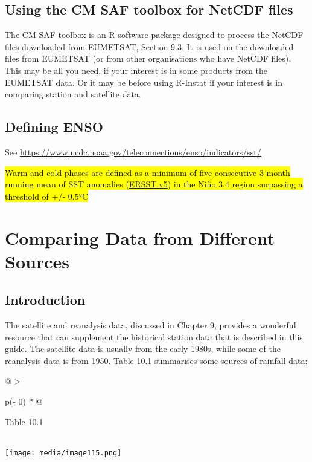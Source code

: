 \documentclass[
  letterpaper,
  DIV=11,
  numbers=noendperiod]{scrreprt}
\begin{document}
\section{Using the CM SAF toolbox for NetCDF
files}\label{using-the-cm-saf-toolbox-for-netcdf-files}

The CM SAF toolbox is an R software package designed to process the
NetCDF files downloaded from EUMETSAT, Section 9.3. It is used on the
downloaded files from EUMETSAT (or from other organisations who have
NetCDF files). This may be all you need, if your interest is in some
products from the EUMETSAT data. Or it may be before using R-Instat if
your interest is in comparing station and satellite data.

\section{Defining ENSO}\label{defining-enso}

See
\href{https://www.ncdc.noaa.gov/teleconnections/enso/indicators/sst/}{\ul{https://www.ncdc.noaa.gov/teleconnections/enso/indicators/sst/}}

\hl{Warm and cold phases are defined as a minimum of five consecutive
3-month running mean of SST anomalies
(\href{http://origin.cpc.ncep.noaa.gov/products/analysis_monitoring/ensostuff/ONI_v5.php}{\ul{ERSST.v5}})
in the Niño 3.4 region surpassing a threshold of +/- 0.5°C}


\chapter{Comparing Data from Different
Sources}\label{comparing-data-from-different-sources}

\section{Introduction}\label{introduction-8}

The satellite and reanalysis data, discussed in Chapter 9, provides a
wonderful resource that can supplement the historical station data that
is described in this guide. The satellite data is usually from the early
1980s, while some of the reanalysis data is from 1950. Table 10.1
summarises some sources of rainfall data:

\begin{longtable}[]{@{}
  >{\raggedright\arraybackslash}p{(\columnwidth - 0\tabcolsep) * }@{}}
\toprule\noalign{}
\begin{minipage}[b]{\linewidth}\raggedright
Table 10.1
\end{minipage} \\
\midrule\noalign{}
\endhead
\bottomrule\noalign{}
\endlastfoot
\texttt{[image: media/image115.png]} \\
\end{longtable}
\end{document}
